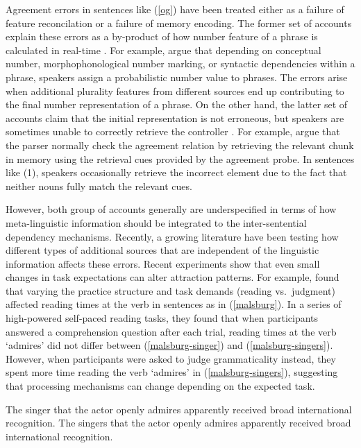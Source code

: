 \documentclass[
  authoryear,
  preprint]{elsarticle}
\begin{document}
Agreement errors in sentences like (\ref{og}) have been treated either
as a failure of feature reconcilation or a failure of memory encoding.
The former set of accounts explain these errors as a by-product of how
number feature of a phrase is calculated in real-time
\citep{BockMiller:1991, EberhardEtAl2005, HammerlyEtAl2019}. For
example, \citet{EberhardEtAl2005} argue that depending on conceptual
number, morphophonological number marking, or syntactic dependencies
within a phrase, speakers assign a probabilistic number value to
phrases. The errors arise when additional plurality features from
different sources end up contributing to the final number representation
of a phrase. On the other hand, the latter set of accounts claim that
the initial representation is not erroneous, but speakers are sometimes
unable to correctly retrieve the controller
\citep{WagersEtAl:2009, Dillon2013a}. For example,
\citet{WagersEtAl:2009} argue that the parser normally check the
agreement relation by retrieving the relevant chunk in memory using the
retrieval cues provided by the agreement probe. In sentences like (1),
speakers occasionally retrieve the incorrect element due to the fact
that neither nouns fully match the relevant cues.

However, both group of accounts generally are underspecified in terms of
how meta-linguistic information should be integrated to the
inter-sentential dependency mechanisms. Recently, a growing literature
have been testing how different types of additional sources that are
independent of the linguistic information affects these errors. Recent
experiments show that even small changes in task expectations can alter
attraction patterns. For example, \citet{LauraMalsbug24} found that
varying the practice structure and task demands (reading vs.~judgment)
affected reading times at the verb in sentences as in (\ref{malsburg}).
In a series of high-powered self-paced reading tasks, they found that
when participants answered a comprehension question after each trial,
reading times at the verb `admires' did not differ between
(\ref{malsburg-singer}) and (\ref{malsburg-singers}). However, when
participants were asked to judge grammaticality instead, they spent more
time reading the verb `admires' in (\ref{malsburg-singers}), suggesting
that processing mechanisms can change depending on the expected task.

\begin{exe}
\ex \label{malsburg}
\begin{xlist}
\ex \label{malsburg-singer} The singer that the actor openly admires apparently received broad international recognition.
\ex \label{malsburg-singers} The singers that the actor openly admires apparently received broad international recognition.
\end{xlist}
\end{exe}
\end{document}
